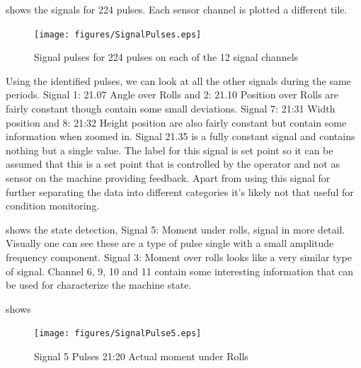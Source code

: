 \documentclass[]{article}
\begin{document}
 shows the signals for 224 pulses. Each sensor channel is plotted a different tile. 
\begin{figure}[H]
    \centering
    \texttt{[image: figures/SignalPulses.eps]}
    \caption{Signal pulses for 224 pulses on each of the 12 signal channels}
    \label{fig:SignalPulses}
\end{figure}

Using the identified pulses, we can look at all the other signals during the same periods. Signal 1: 21.07 Angle over Rolls and 2: 21.10 Position over Rolls are fairly constant though contain some small deviations. Signal 7: 21:31 Width position and  8: 21:32 Height position are also fairly constant but contain some information when zoomed in. Signal 21.35 is a fully constant signal and contains nothing but a single value. The label for this signal is set point so it can be assumed that this is a set point that is controlled by the operator and not as sensor on the machine providing feedback. Apart from using this signal for further separating the data into different categories it's likely not that useful for condition monitoring.

 shows the state detection, Signal 5: Moment under rolls, signal in more detail. Visually one can see these are a type of pulse single with a small amplitude frequency component. Signal 3: Moment over rolls looks like a very similar type of signal. Channel 6, 9, 10 and 11 contain some interesting information that can be used for characterize the machine state.

 
 


 shows 
\begin{figure}[H]
    \centering
    \texttt{[image: figures/SignalPulse5.eps]}
    \caption{Signal 5 Pulses 21:20 Actual moment under Rolls}
    \label{fig:SignalPulse5}
\end{figure}
\end{document}

